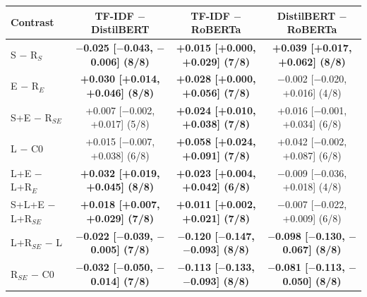 \begin{tabular}{@{}lccc@{}}
\toprule
Contrast & TF-IDF $-$ DistilBERT & TF-IDF $-$ RoBERTa & DistilBERT $-$ RoBERTa \\
\midrule
S $-$ R$_S$ & \textbf{$-$0.025 [$-$0.043, $-$0.006] (8/8)} & \textbf{+0.015 [+0.000, +0.029] (7/8)} & \textbf{+0.039 [+0.017, +0.062] (8/8)} \\
E $-$ R$_E$ & \textbf{+0.030 [+0.014, +0.046] (8/8)} & \textbf{+0.028 [+0.000, +0.056] (7/8)} & $-$0.002 [$-$0.020, +0.016] (4/8) \\
S+E $-$ R$_{SE}$ & +0.007 [$-$0.002, +0.017] (5/8) & \textbf{+0.024 [+0.010, +0.038] (7/8)} & +0.016 [$-$0.001, +0.034] (6/8) \\
L $-$ C0 & +0.015 [$-$0.007, +0.038] (6/8) & \textbf{+0.058 [+0.024, +0.091] (7/8)} & +0.042 [$-$0.002, +0.087] (6/8) \\
\midrule
L+E $-$ L+R$_E$ & \textbf{+0.032 [+0.019, +0.045] (8/8)} & \textbf{+0.023 [+0.004, +0.042] (6/8)} & $-$0.009 [$-$0.036, +0.018] (4/8) \\
S+L+E $-$ L+R$_{SE}$ & \textbf{+0.018 [+0.007, +0.029] (7/8)} & \textbf{+0.011 [+0.002, +0.021] (7/8)} & $-$0.007 [$-$0.022, +0.009] (6/8) \\
L+R$_{SE}$ $-$ L & \textbf{$-$0.022 [$-$0.039, $-$0.005] (7/8)} & \textbf{$-$0.120 [$-$0.147, $-$0.093] (8/8)} & \textbf{$-$0.098 [$-$0.130, $-$0.067] (8/8)} \\
R$_{SE}$ $-$ C0 & \textbf{$-$0.032 [$-$0.050, $-$0.014] (7/8)} & \textbf{$-$0.113 [$-$0.133, $-$0.093] (8/8)} & \textbf{$-$0.081 [$-$0.113, $-$0.050] (8/8)} \\
\bottomrule
\end{tabular}
